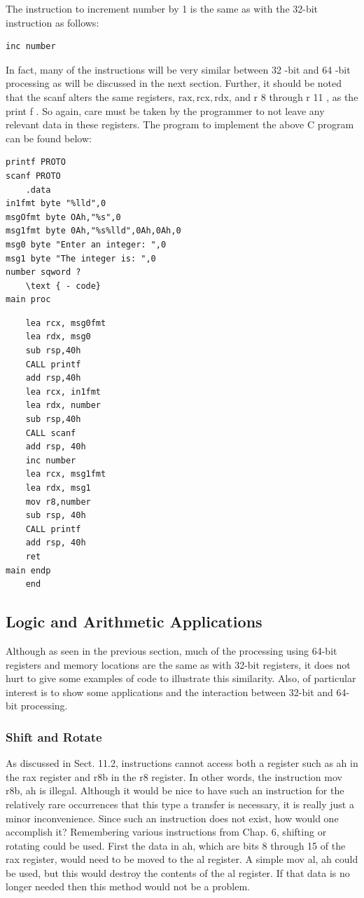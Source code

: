 \documentclass[10pt]{article}
\begin{document}
The instruction to increment number by 1 is the same as with the 32-bit instruction as follows:

\begin{verbatim}
inc number
\end{verbatim}

In fact, many of the instructions will be very similar between 32 -bit and 64 -bit processing as will be discussed in the next section. Further, it should be noted that the scanf alters the same registers, $\mathrm{rax}, \mathrm{rcx}, \mathrm{rdx}$, and r 8 through r 11 , as the print f . So again, care must be taken by the programmer to not leave any relevant data in these registers. The program to implement the above C program can be found below:

\begin{verbatim}
printf PROTO
scanf PROTO
    .data
in1fmt byte "%lld",0
msgOfmt byte OAh,"%s",0
msg1fmt byte 0Ah,"%s%lld",0Ah,0Ah,0
msg0 byte "Enter an integer: ",0
msg1 byte "The integer is: ",0
number sqword ?
    \text { - code}
main proc
\end{verbatim}

\begin{verbatim}
    lea rcx, msg0fmt
    lea rdx, msg0
    sub rsp,40h
    CALL printf
    add rsp,40h
    lea rcx, in1fmt
    lea rdx, number
    sub rsp,40h
    CALL scanf
    add rsp, 40h
    inc number
    lea rcx, msg1fmt
    lea rdx, msg1
    mov r8,number
    sub rsp, 40h
    CALL printf
    add rsp, 40h
    ret
main endp
    end
\end{verbatim}

\subsection*{Logic and Arithmetic Applications}
Although as seen in the previous section, much of the processing using 64-bit registers and memory locations are the same as with 32-bit registers, it does not hurt to give some examples of code to illustrate this similarity. Also, of particular interest is to show some applications and the interaction between 32-bit and 64-bit processing.

\subsubsection*{Shift and Rotate}
As discussed in Sect. 11.2, instructions cannot access both a register such as ah in the rax register and r8b in the r8 register. In other words, the instruction mov r8b, ah is illegal. Although it would be nice to have such an instruction for the\\
relatively rare occurrences that this type a transfer is necessary, it is really just a minor inconvenience. Since such an instruction does not exist, how would one accomplish it? Remembering various instructions from Chap. 6, shifting or rotating could be used. First the data in ah, which are bits 8 through 15 of the rax register, would need to be moved to the al register. A simple mov al, ah could be used, but this would destroy the contents of the al register. If that data is no longer needed then this method would not be a problem.
\end{document}
